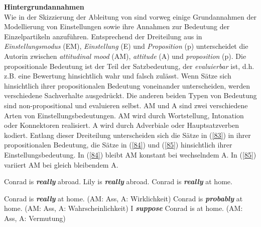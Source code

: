 \noindent
\textbf{Hintergrundannahmen}\\
Wie in der Skizzierung der Ableitung von \citet{Doherty1985} sind vorweg einige Grundannahmen der Modellierung von Einstellungen sowie ihre Annahmen zur Bedeutung der Einzelpartikeln anzuführen. Entsprechend der Dreiteilung aus \citet{Doherty1985} in \textit{Einstellungsmodus} (EM), \textit{Einstellung} (E) und \textit{Proposition} (p) unterscheidet die Autorin zwischen \textit{attitudinal mood}  (AM), \textit{attitude}  (A) und \textit{proposition} (p). Die propositionale Bedeutung ist der Teil der Satzbedeutung, der \textit{evaluierbar}  ist, d.h. z.B. eine Bewertung hinsichtlich wahr und falsch zulässt. Wenn Sätze sich hinsichtlich ihrer propositionalen Bedeutung voneinander unterscheiden, werden verschiedene Sachverhalte ausgedrückt. Die anderen beiden Typen von Bedeutung sind non-propositional und evaluieren selbst. AM und A sind zwei verschiedene Arten von Einstellungsbedeutungen. AM wird durch Wortstellung, Intonation oder Konnektoren realisiert. A wird durch Adverbiale oder Hauptsatzverben kodiert. Entlang dieser Dreiteilung unterscheiden sich die Sätze in (\ref{83}) in ihrer propositionalen Bedeutung, die Sätze in (\ref{84}) und (\ref{85}) hinsichtlich ihrer Einstellungsbedeutung. In (\ref{84}) bleibt AM konstant bei wechselndem A. In (\ref{85}) variiert AM bei gleich bleibendem A.

\begin{exe}
	\ex\label{83} 
		\begin{xlist}	
			\ex\label{83a} Conrad is \textbf{\textit{really}} abroad.
			\ex\label{83b} Lily is \textbf{\textit{really}} abroad.
			\ex\label{83c} Conrad is \textbf{\textit{really}} at home.
		\end{xlist}
\end{exe}

\begin{exe}
	\ex\label{84} 
		\begin{xlist}	
			\ex\label{84a} Conrad is \textbf{\textit{really}} at home. (AM: Ass, A: Wirklichkeit)
			\ex\label{84b} Conrad is \textbf{\textit{probably}} at home. (AM: Ass, A: Wahrscheinlichkeit)
			\ex\label{84c} I \textbf{\textit{suppose}} Conrad is at home. (AM: Ass, A: Vermutung)
		\end{xlist}
\end{exe}

